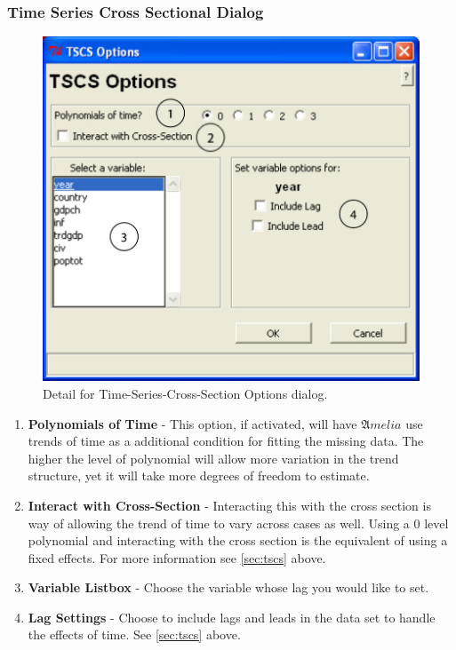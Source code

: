 \documentclass[12pt,titlepage]{article}
\begin{document}
\subsubsection{Time Series Cross Sectional Dialog}
\label{sec:tscsdiag}
\begin{figure}[ht]
  \centering
  \includegraphics[scale=.75]{tscs}
  \caption{Detail for Time-Series-Cross-Section Options dialog.}
\end{figure}
\begin{enumerate}
\item \textbf{Polynomials of Time} - This option, if activated, will have ${\mathfrak Amelia}$ use trends of time as a additional condition for fitting the missing data.  The higher the level of polynomial will allow more variation in the trend structure, yet it will take more degrees of freedom to estimate. 
\item \textbf{Interact with Cross-Section} - Interacting this with the cross section is way of allowing the trend of time to vary across cases as well.  Using a 0 level polynomial and interacting with the cross section is the equivalent of using a fixed effects.  For more information see \ref{sec:tscs} above.  
\item \textbf{Variable Listbox} - Choose the variable whose lag you would like to set.
\item \textbf{Lag Settings} - Choose to include lags and leads in the data set to handle the effects of time.  See \ref{sec:tscs} above.
\end{enumerate}
\end{document}
